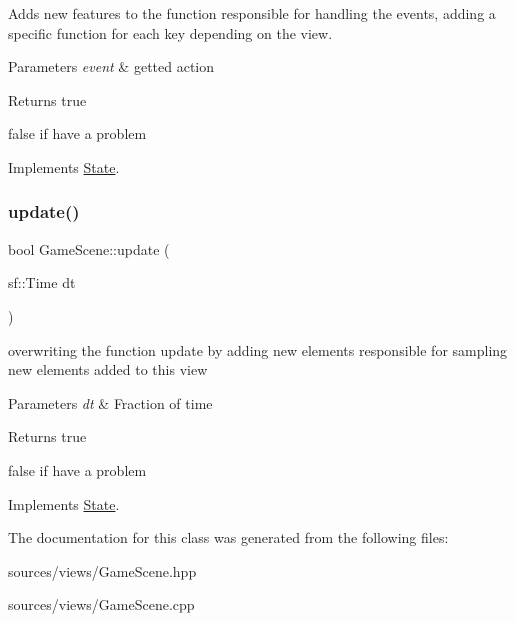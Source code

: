 Adds new features to the function responsible for handling the events, adding a specific function for each key depending on the view. 


\begin{DoxyParams}{Parameters}
{\em event} & getted action \\
\hline
\end{DoxyParams}
\begin{DoxyReturn}{Returns}
true 

false if have a problem 
\end{DoxyReturn}


Implements \hyperlink{classState_a19965f83460b248c42952aac8d001206}{State}.

\mbox{\label{classGameScene_ac47e1a8082955a6c7af92cf7dbdd9347}} 
\subsubsection{\texorpdfstring{update()}{update()}}
{\footnotesize\ttfamily bool Game\+Scene\+::update (\begin{DoxyParamCaption}\item[{sf\+::\+Time}]{dt }\end{DoxyParamCaption})\hspace{0.3cm}{\ttfamily [virtual]}}



overwriting the function update by adding new elements responsible for sampling new elements added to this view 


\begin{DoxyParams}{Parameters}
{\em dt} & Fraction of time \\
\hline
\end{DoxyParams}
\begin{DoxyReturn}{Returns}
true 

false if have a problem 
\end{DoxyReturn}


Implements \hyperlink{classState_acd5926bc7a373edff9e57f3ffe94ca13}{State}.



The documentation for this class was generated from the following files\+:\begin{DoxyCompactItemize}
\item 
sources/views/Game\+Scene.\+hpp\item 
sources/views/Game\+Scene.\+cpp\end{DoxyCompactItemize}
